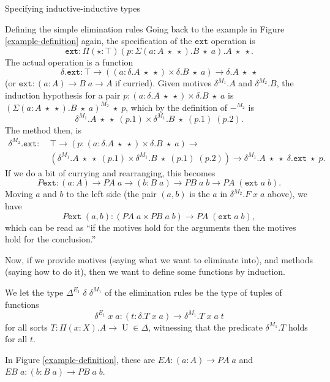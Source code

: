 \documentclass[runningheads]{llncs}
\DeclareMathOperator{\UU}{U}
\newcommand{\join}{\texttt{ext}}
\newcommand{\PA}{\mathit{PA}}
\newcommand{\PB}{\mathit{PB}}
\newcommand{\EA}{\mathit{EA}}
\newcommand{\EB}{\mathit{EB}}
\begin{document}
{\begin{section}{Specifying inductive-inductive types}
\begin{subsection}{\label{simple-elim-section}Defining the simple elimination rules}
Going back to the example in Figure \ref{example-definition} again, the specification of the $\join$ operation is \[\join : \Pi(\star : \top)(p : \Sigma(a : A\;\star\;\star).B\;\star\;a).A\;\star\;\star.\]
The actual operation is a function \[\delta.\join : \top \to ((a : \delta.A\;\star\;\star)\times \delta.B\;\star\;a) \to \delta.A\;\star\;\star\] (or $\join : (a : A) \to B\;a \to A$ if curried).
Given motives $\delta^{M_1}.A$ and $\delta^{M_2}.B$, the induction hypothesis for a pair $p : (a : \delta.A\;\star\;\star)\times \delta.B\;\star\;a$ is $(\Sigma(a : A\;\star\;\star).B\;\star\;a)^{M_2}\;\star\;p$, which by the definition of $-^{M_2}$ is \[\delta^{M_1}.A\;\star\;\star\;(p.1) \times \delta^{M_1}.B\;\star\;(p.1)\;(p.2).\] The method then, is \begin{align*}\delta^{M_2}.\join :&\; \top \to (p : (a : \delta.A\;\star\;\star)\times \delta.B\;\star\;a) \to\\&\; (\delta^{M_1}.A\;\star\;\star\;(p.1) \times \delta^{M_1}.B\;\star\;(p.1)\;(p.2)) \to \delta^{M_1}.A\;\star\;\star\;\delta.\join\;\star\;p.\end{align*} If we do a bit of currying and rearranging, this becomes \[P\join : (a : A) \to \PA\;a \to (b : B\;a) \to \PB\;a\;b \to \PA\;(\join\;a\;b).\] Moving $a$ and $b$ to the left side (the pair $(a, b)$ is the $a$ in $\delta^{M_2}.F\;x\;a$ above), we have \[P\join\;(a, b) : (\PA\;a \times \PB\;a\;b) \to \PA\;(\join\;a\;b),\] which can be read as ``if the motives hold for the arguments then the motives hold for the conclusion.''

Now, if we provide motives (saying what we want to eliminate into), and methods (saying how to do it), then we want to define some functions by induction.

\begin{definition}
We let the type $\Delta^{E_1}\;\delta\;\delta^{M_1}$ of the elimination rules be the type of tuples of functions \[\delta^{E_1} \;x\;a : (t : \delta.T\;x\;a) \to \delta^{M_1}.T\;x\;a\;t \] for all sorts $T : \Pi(x : X).A\to\UU \in\Delta$, witnessing that the predicate $\delta^{M_1}.T$ holds for all $t$.
\end{definition}

In Figure \ref{example-definition}, these are $\EA : (a : A) \to \PA\;a$ and $\EB\;a : (b : B\;a) \to \PB\;a\;b$.


\end{subsection}
\end{section}}
\end{document}
